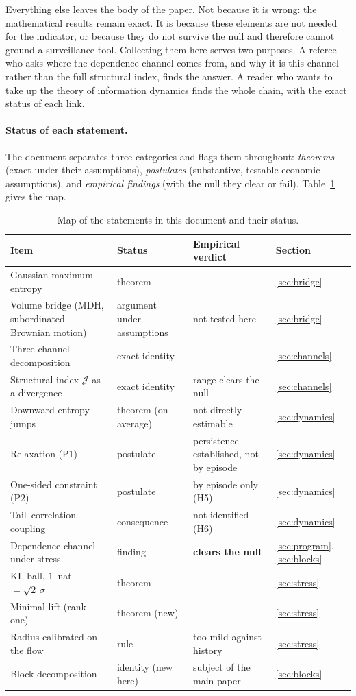 \documentclass[11pt]{article}
\theoremstyle{definition}
\theoremstyle{remark}
\newcommand{\JJ}{\mathcal{J}}
\begin{document}
Everything else leaves the body of the paper. Not because it is wrong: the
mathematical results remain exact. It is because these elements are not needed
for the indicator, or because they do not survive the null and therefore
cannot ground a surveillance tool. Collecting them here serves two purposes. A
referee who asks where the dependence channel comes from, and why it is this
channel rather than the full structural index, finds the answer. A reader who
wants to take up the theory of information dynamics finds the whole chain, with
the exact status of each link.

\paragraph{Status of each statement.} The document separates three categories
and flags them throughout: \emph{theorems} (exact under their assumptions),
\emph{postulates} (substantive, testable economic assumptions), and
\emph{empirical findings} (with the null they clear or fail).
Table~\ref{tab:statut} gives the map.

\begin{table}[htbp]
\centering
\small
\begin{tabular}{@{}p{5.0cm}p{3.0cm}p{4.6cm}l@{}}
\toprule
Item & Status & Empirical verdict & Section \\
\midrule
Gaussian maximum entropy & theorem & --- & \ref{sec:bridge} \\
Volume bridge (MDH, subordinated Brownian motion) & argument under assumptions & not tested here & \ref{sec:bridge} \\
Three-channel decomposition & exact identity & --- & \ref{sec:channels} \\
Structural index $\JJ$ as a divergence & exact identity & range clears the null & \ref{sec:channels} \\
Downward entropy jumps & theorem (on average) & not directly estimable & \ref{sec:dynamics} \\
Relaxation (P1) & postulate & persistence established, not by episode & \ref{sec:dynamics} \\
One-sided constraint (P2) & postulate & by episode only (H5) & \ref{sec:dynamics} \\
Tail--correlation coupling & consequence & not identified (H6) & \ref{sec:dynamics} \\
Dependence channel under stress & finding & \textbf{clears the null} & \ref{sec:program}, \ref{sec:blocks} \\
KL ball, $1$~nat $=\sqrt2\,\sigma$ & theorem & --- & \ref{sec:stress} \\
Minimal lift (rank one) & theorem (new) & --- & \ref{sec:stress} \\
Radius calibrated on the flow & rule & too mild against history & \ref{sec:stress} \\
Block decomposition & identity (new here) & subject of the main paper & \ref{sec:blocks} \\
\bottomrule
\end{tabular}
\caption{Map of the statements in this document and their status.}
\label{tab:statut}
\end{table}
\end{document}

